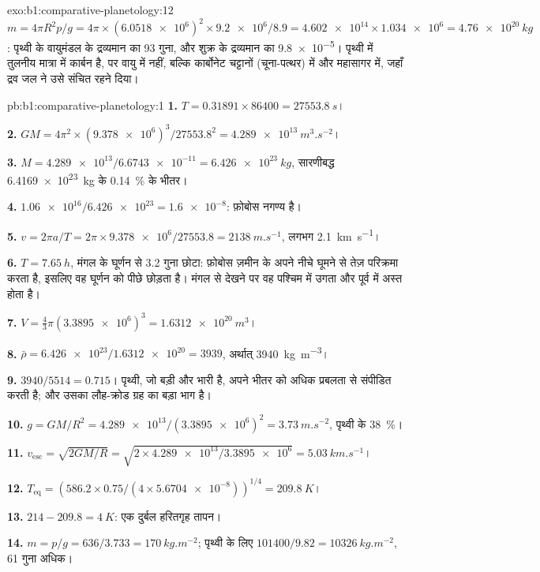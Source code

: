 \begin{solution}{exo:b1:comparative-planetology:12}
$m = 4\pi R^2p/g = 4\pi\times(\num{6.0518e6})^2\times\num{9.2e6}/8.9 =
\num{4.602e14}\times\num{1.034e6} = \qty{4.76e20}{kg}$: पृथ्वी के वायुमंडल के द्रव्यमान का 93 गुना, और
शुक्र के द्रव्यमान का \num{9.8e-5}। पृथ्वी में तुलनीय मात्रा में कार्बन है, पर वायु में नहीं, बल्कि
कार्बोनेट चट्टानों (चूना-पत्थर) में और महासागर में, जहाँ द्रव जल ने उसे संचित रहने दिया।
\end{solution}

\begin{solution}{pb:b1:comparative-planetology:1}
\textbf{1.} $T = 0.31891\times86400 = \qty{27553.8}{s}$।

\textbf{2.} $GM = 4\pi^2\times(\num{9.378e6})^3/\num{27553.8}^2 =
\qty{4.289e13}{m^3.s^{-2}}$।

\textbf{3.} $M = \num{4.289e13}/\num{6.6743e-11} = \qty{6.426e23}{kg}$,
सारणीबद्ध \qty{6.4169e23}{kg} के \qty{0.14}{\percent} के भीतर।

\textbf{4.} $\num{1.06e16}/\num{6.426e23} = \num{1.6e-8}$: फ़ोबोस नगण्य है।

\textbf{5.} $v = 2\pi a/T = 2\pi\times\num{9.378e6}/27553.8 =
\qty{2138}{m.s^{-1}}$, लगभग \qty{2.1}{km.s^{-1}}।

\textbf{6.} $T = \qty{7.65}{h}$, मंगल के घूर्णन से 3.2 गुना छोटा: फ़ोबोस ज़मीन के अपने नीचे घूमने से
तेज़ परिक्रमा करता है, इसलिए वह घूर्णन को पीछे छोड़ता है। मंगल से देखने पर वह पश्चिम में उगता और
पूर्व में अस्त होता है।

\textbf{7.} $V = \tfrac43\pi(\num{3.3895e6})^3 = \qty{1.6312e20}{m^3}$।

\textbf{8.} $\bar\rho = \num{6.426e23}/\num{1.6312e20} = 3939$, अर्थात्
\qty{3940}{kg.m^{-3}}।

\textbf{9.} $3940/5514 = 0.715$। पृथ्वी, जो बड़ी और भारी है, अपने भीतर को अधिक प्रबलता से संपीडित
करती है; और उसका लौह-क्रोड ग्रह का बड़ा भाग है।

\textbf{10.} $g = GM/R^2 = \num{4.289e13}/(\num{3.3895e6})^2 =
\qty{3.73}{m.s^{-2}}$, पृथ्वी के \qty{38}{\percent}।

\textbf{11.} $v_\mathrm{esc} = \sqrt{2GM/R} = \sqrt{2\times\num{4.289e13}/
\num{3.3895e6}} = \qty{5.03}{km.s^{-1}}$।

\textbf{12.} $T_\mathrm{eq} = (586.2\times0.75/(4\times\num{5.6704e-8}))^{1/4}
= \qty{209.8}{K}$।

\textbf{13.} $214 - 209.8 = \qty{4}{K}$: एक दुर्बल हरितगृह तापन।

\textbf{14.} $m = p/g = 636/3.733 = \qty{170}{kg.m^{-2}}$; पृथ्वी के लिए
$101400/9.82 = \qty{10326}{kg.m^{-2}}$, 61 गुना अधिक।


\end{solution}
